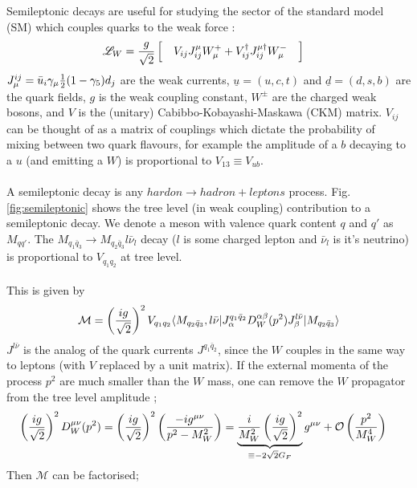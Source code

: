 \documentclass[a4paper,10pt]{article}
\numberwithin{equation}{section}
\begin{document}
Semileptonic decays are useful for studying the sector of the standard model (SM) which couples quarks to the weak force \cite{Richman:1995wm}:
\begin{align}
 \mathscr{L}_{W} & = {g\over\sqrt{2}} \left[ \quad V_{ij} J_{ij}^{\mu} W_{\mu}^+ + V^{\dagger}_{ij} J_{ij}^{\mu \dagger} W_{\mu}^- \quad \right]
  \label{eq:weakL}
\end{align}
$J_{\mu}^{ij} = \bar{u}_i \gamma_{\mu} {1\over2}(1-\gamma_5) d_j$ are the weak currents,
$\underline{u} = ( u, c, t )$ and $\underline{d} = ( d, s, b )$ are the quark fields, $g$ is the weak coupling constant, $W^{\pm}$ are the charged weak bosons, and $V$ is the (unitary)
Cabibbo-Kobayashi-Maskawa (CKM) matrix. $V_{ij}$ can be thought of as a matrix of couplings which dictate the probability
of mixing between two quark flavours, for example the amplitude of a $b$ decaying to a $u$ (and emitting a $W$) is proportional to $V_{13} \equiv V_{ub}$.
\\ \\
A semileptonic decay is any $hardon\to hadron+leptons$ process. Fig. \ref{fig:semileptonic} shows the tree level (in weak coupling) contribution to a semileptonic decay. We denote a meson with valence quark content $q$ and $q'$ as $M_{qq'}$. The $M_{q_1\bar{q}_3} \to M_{q_2\bar{q}_3} l \bar{\nu}_l$ decay ($l$ is some charged lepton and $\bar{\nu}_l$ is it's neutrino) is proportional to $V_{q_1q_2}$ at tree level.
\\ \\
This is given by
\begin{align}
  \mathcal{M} = \left({ig\over\sqrt{2}}\right)^2 V_{q_1q_2} \langle M_{q_2\bar{q}_3}, l\bar{\nu} | J_{\alpha}^{q_1\bar{q}_2} D^{\alpha\beta}_W(p^2) J^{l\bar{\nu}}_{\beta} | M_{q_2\bar{q}_3} \rangle
\end{align}
$J^{l\bar{\nu}}$ is the analog of the quark currents $J^{q_1\bar{q}_2}$, since the $W$ couples in the same way to leptons (with $V$ replaced by a unit matrix).
If the external momenta of the process $p^2$ are much smaller than the $W$ mass, one can remove the $W$ propagator from the tree level amplitude \cite{Borasoy:2007yi};
\begin{align}
 \left({ig\over\sqrt{2}}\right)^2 D^{\mu\nu}_W(p^2) = \left({ig\over\sqrt{2}}\right)^2 \left( -ig^{\mu\nu} \over p^2 - M_W^2 \right)
  & = \underbrace{ {i\over M_W^2} \left( ig \over \sqrt{2} \right)^2  }_{\equiv -2\sqrt{2}G_F} g^{\mu\nu} + \mathcal{O}\left({p^2\over M_W^4}\right)
\end{align}
Then $\mathcal{M}$ can be factorised;
\end{document}
